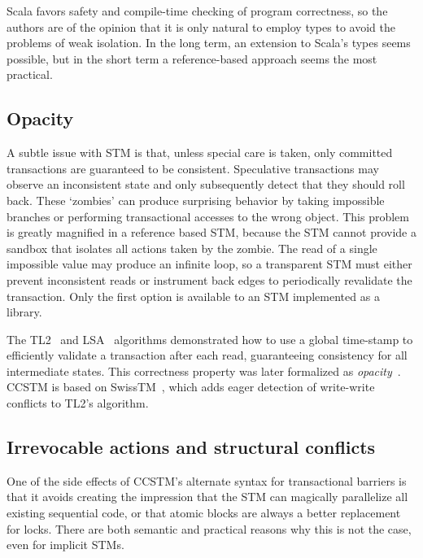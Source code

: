 Scala favors safety and compile-time checking of program correctness,
so the authors are of the opinion that it is only natural to employ types
to avoid the problems of weak isolation.  In the long term, an extension
to Scala's types seems possible, but in the short term a reference-based
approach seems the most practical.

\subsection{Opacity}

A subtle issue with STM is that, unless special care is taken, only
committed transactions are guaranteed to be consistent.  Speculative
transactions may observe an inconsistent state and only subsequently
detect that they should roll back.  These `zombies' can produce
surprising behavior by taking impossible branches or performing
transactional accesses to the wrong object.  This problem is greatly
magnified in a reference based STM, because the STM cannot provide a
sandbox that isolates all actions taken by the zombie.  The read of a
single impossible value may produce an infinite loop, so a transparent
STM must either prevent inconsistent reads or instrument back edges
to periodically revalidate the transaction.  Only the first option is
available to an STM implemented as a library.

The TL2~\cite{dice06tl2} and LSA~\cite{riegel06lsa} algorithms
demonstrated how to use a global time-stamp to efficiently validate
a transaction after each read, guaranteeing consistency for all
intermediate states.  This correctness property was later formalized
as \textit{opacity}~\cite{guerraoui08opacity}.  CCSTM is based on
SwissTM~\cite{dragojevic09swisstm}, which adds eager detection of
write-write conflicts to TL2's algorithm.

\subsection{Irrevocable actions and structural conflicts}

One of the side effects of CCSTM's alternate syntax for transactional barriers
is that it avoids creating the impression that the STM can magically
parallelize all existing sequential code, or that atomic blocks are
always a better replacement for locks.  There are both semantic and
practical reasons why this is not the case, even for implicit STMs.

